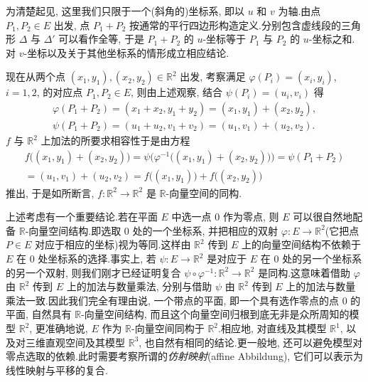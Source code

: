 为清楚起见, 这里我们只限于一个(斜角的)坐标系, 即以 $u$ 和 $v$ 为轴.由点 $P_1, P_2 \in E$ 出发, 点 $P_1 + P_2$ 按通常的平行四边形构造定义.分别包含虚线段的三角形 $\Delta$ 与 $\Delta'$ 可以看作全等, 于是 $P_1 + P_2$ 的 $u$-坐标等于 $P_1$ 与 $P_2$ 的 $u$-坐标之和.对 $v$-坐标以及关于其他坐标系的情形成立相应结论.

现在从两个点 $(x_1, y_1), (x_2, y_2) \in \mathbb{R}^2$ 出发, 考察满足 $\varphi(P_i) = (x_i, y_i)$, $i = 1, 2$, 的对应点 $P_1, P_2 \in E$, 则由上述观察, 结合 $\psi(P_i) = (u_i, v_i)$ 得
\[
\begin{array}{l}
\varphi(P_1 + P_2) = (x_1 + x_2, y_1 + y_2) = (x_1, y_1) + (x_2, y_2), \\
\psi(P_1 + P_2) = (u_1 + u_2, v_1 + v_2) = (u_1, v_1) + (u_2, v_2)\text{.}
\end{array}
\]
$f$ 与 $\mathbb{R}^2$ 上加法的所要求相容性于是由方程
\[
\begin{array}{c}
f\big((x_1, y_1) + (x_2, y_2)\big) = \psi\big(\varphi^{-1}\big((x_1, y_1) + (x_2, y_2)\big)\big) = \psi(P_1 + P_2) \\
= (u_1, v_1) + (u_2, v_2) = f\big((x_1, y_1)\big) + f\big((x_2, y_2)\big)
\end{array}
\]
推出, 于是如所断言, $f \colon \mathbb{R}^2 \longrightarrow \mathbb{R}^2$ 是 $\mathbb{R}$-向量空间的同构.

上述考虑有一个重要结论.若在平面 $E$ 中选一点 $0$ 作为零点, 则 $E$ 可以很自然地配备 $\mathbb{R}$-向量空间结构.即选取 $0$ 处的一个坐标系, 并把相应的双射 $\varphi \colon E \longrightarrow \mathbb{R}^2$(它把点 $P \in E$ 对应于相应的坐标)视为等同.这样由 $\mathbb{R}^2$ 传到 $E$ 上的向量空间结构不依赖于 $E$ 在 $0$ 处坐标系的选择.事实上, 若 $\psi \colon E \longrightarrow \mathbb{R}^2$ 是对应于 $E$ 在 $0$ 处的另一个坐标系的另一个双射, 则我们刚才已经证明复合 $\psi \circ \varphi^{-1} \colon \mathbb{R}^2 \longrightarrow \mathbb{R}^2$ 是同构.这意味着借助 $\varphi$ 由 $\mathbb{R}^2$ 传到 $E$ 上的加法与数量乘法, 分别与借助 $\psi$ 由 $\mathbb{R}^2$ 传到 $E$ 上的加法与数量乘法一致.因此我们完全有理由说, 一个带点的平面, 即一个具有选作零点的点 $0$ 的平面, 自然具有 $\mathbb{R}$-向量空间结构, 而且这个向量空间归根到底无非是众所周知的模型 $\mathbb{R}^2$, 更准确地说, $E$ 作为 $\mathbb{R}$-向量空间同构于 $\mathbb{R}^2$.相应地, 对直线及其模型 $\mathbb{R}^1$, 以及对三维直观空间及其模型 $\mathbb{R}^3$, 也自然有相同的结论.更一般地, 还可以避免模型对零点选取的依赖.此时需要考察所谓的\emph{仿射映射}(\textup{affine Abbildung}), 它们可以表示为线性映射与平移的复合.

